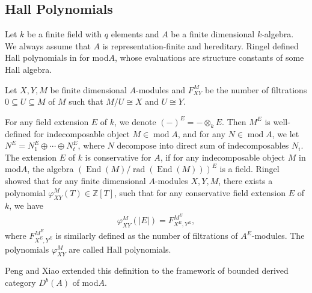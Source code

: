 \documentclass[12pt]{amsart}
\begin{document}
\subsection{Hall Polynomials}

Let $k$ be a finite field with $q$ elements and $A$ be a finite dimensional $k$-algebra.
We always assume that $A$ is representation-finite and hereditary.
Ringel defined Hall polynomials in \cite{Ringel1990}\cite{RingelLie} for mod$A$, whose evaluations are structure constants of some Hall algebra.

Let $X,Y,M$ be finite dimensional $A$-modules and $F_{XY}^M$ be the number of filtrations 
   $ 0 \subseteq U \subseteq M$
of $M$ such that $M/U \cong X$ and $U\cong Y$.

For any field extension $E$ of $k$, we denote $(-)^E = - \otimes_k E$.
Then $M^E$ is well-defined for indecomposable object $M\in \operatorname{mod}A$, and for any $N\in \operatorname{mod}A$, we let $N^E=N_1^E\oplus \cdots \oplus N_t^E$, where $N$ decompose into direct sum of indecomposables $N_i$.
The extension $E$ of $k$ is conservative for $A$, if for any indecomposable object $M$ in mod$A$, the algebra $(\operatorname{End}(M)/\operatorname{rad}(\operatorname{End}(M)))^E$ is a field.
Ringel showed that for any finite dimensional $A$-modules $X,Y,M$, there exists a polynomial $\varphi_{XY}^M(T) \in \mathbb{Z}[T]$, such that for any conservative field extension $E$ of $k$, we have 
\begin{align*}
    \varphi_{XY}^M(|E|) = F_{X^E,Y^E}^{M^E},
\end{align*}
where $F_{X^E,Y^E}^{M^E}$ is similarly defined as the number of filtrations of $A^E$-modules.
The polynomials $\varphi_{XY}^M$ are called Hall polynomials.

Peng and Xiao\cite{1997ROOT} extended this definition to the framework of bounded derived category $D^b(A)$ of mod$A$.
\end{document}
